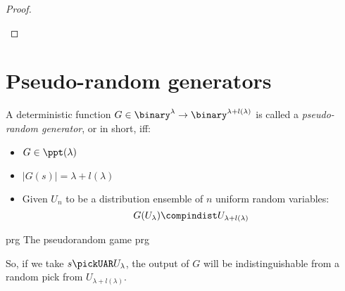 \begin{proof}
\begin{cryptoredux}
      
        

        
    \end{cryptoredux}

\end{proof}


\section{Pseudo-random generators}

A deterministic function $G \in \binary^\lambda \to \binary^{\lambda + l(\lambda)}$ is called a \emph{pseudo-random generator}, or \prg{} in short, iff:

\begin{itemize}
    \item $G \in \ppt(\lambda)$
    \item $|G(s)| = \lambda + l(\lambda)$ %
    \item Given $U_n$ to be a distribution ensemble of $n$ uniform random variables:
    \[
        G(U_{\lambda}) \compindist U_{\lambda + l(\lambda)}
    \]
\end{itemize}

\begin{cryptogame}
    {prg}
    {The pseudorandom game}
    {prg}
    

    \cseqdelay

    
\end{cryptogame}

So, if we take $s \pickUAR U_\lambda$, the output of $G$ will be indistinguishable from a random pick from $U_{\lambda + l(\lambda)}$.
